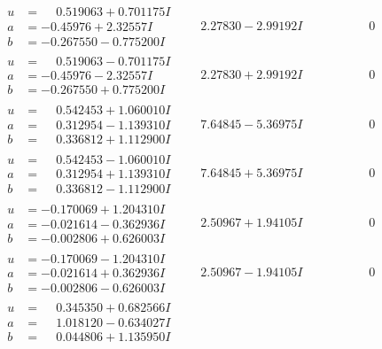 \documentclass[1p]{elsarticle_modified}
\theoremstyle{definition}
\begin{document}
$$\begin{array}{c|c|c}
\begin{aligned}
u &= \phantom{-}0.519063 + 0.701175 I \\
a &= -0.45976 + 2.32557 I \\
b &= -0.267550 - 0.775200 I\end{aligned}
 & \phantom{-}2.27830 - 2.99192 I & \phantom{-0.000000 } 0 \\ \hline\begin{aligned}
u &= \phantom{-}0.519063 - 0.701175 I \\
a &= -0.45976 - 2.32557 I \\
b &= -0.267550 + 0.775200 I\end{aligned}
 & \phantom{-}2.27830 + 2.99192 I & \phantom{-0.000000 } 0 \\ \hline\begin{aligned}
u &= \phantom{-}0.542453 + 1.060010 I \\
a &= \phantom{-}0.312954 - 1.139310 I \\
b &= \phantom{-}0.336812 + 1.112900 I\end{aligned}
 & \phantom{-}7.64845 - 5.36975 I & \phantom{-0.000000 } 0 \\ \hline\begin{aligned}
u &= \phantom{-}0.542453 - 1.060010 I \\
a &= \phantom{-}0.312954 + 1.139310 I \\
b &= \phantom{-}0.336812 - 1.112900 I\end{aligned}
 & \phantom{-}7.64845 + 5.36975 I & \phantom{-0.000000 } 0 \\ \hline\begin{aligned}
u &= -0.170069 + 1.204310 I \\
a &= -0.021614 - 0.362936 I \\
b &= -0.002806 + 0.626003 I\end{aligned}
 & \phantom{-}2.50967 + 1.94105 I & \phantom{-0.000000 } 0 \\ \hline\begin{aligned}
u &= -0.170069 - 1.204310 I \\
a &= -0.021614 + 0.362936 I \\
b &= -0.002806 - 0.626003 I\end{aligned}
 & \phantom{-}2.50967 - 1.94105 I & \phantom{-0.000000 } 0 \\ \hline\begin{aligned}
u &= \phantom{-}0.345350 + 0.682566 I \\
a &= \phantom{-}1.018120 - 0.634027 I \\
b &= \phantom{-}0.044806 + 1.135950 I\end{aligned}

\end{array}$$
\end{document}
